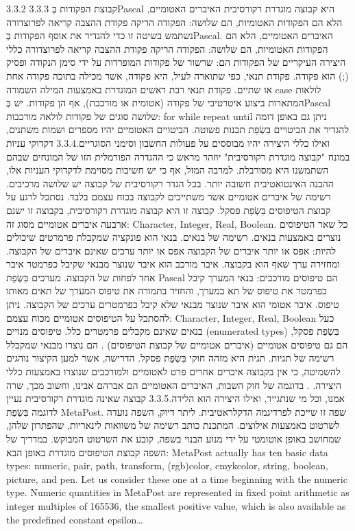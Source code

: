 3.3.2
​3.3.3​ קבוצת הפקודות בְּPascal היא קבוצה מוגדרת רקורסיבית
האיברים האטומיים, הלא הם הפקודות האטומיות, הם שלושה:
הפקודה הריקה
פקודת ההצבה
קריאה לפרוצדורה
נשתמש בשיטה זו כדי להגדיר את אוסף הפקודות בְּPascal. האיברים האטומיים, הלא הם הפקודות האטומיות, הם שלושה:
הפקודה הריקה
פקודת ההצבה
קריאה לפרוצדורה
כללי היצירה העיקריים של הפקודות הם:
שרשור של פקודות המופרדות על ידי סימן הנקודה ופסיק (;) הוא פקודה.
פקודת תנאי, כפי שתוארה לעיל, היא פקודה, אשר מכילה בתוכה פקודה אחת או שתיים.
פקודת תנאי רבת ראשים המוגדרת באמצעות המילה השמורה case
לולאות המתארות ביצוע איטרטיבי של פקודה (אטומית או מורכבת), אף הן פקודות. יש בְּPascal שלושה סוגים של פקודות לולאה מורכבות:
for
while
repeat until
ניתן גם באופן דומה להגדיר את הביטויים בִּשְׂפַת תכנות פשוטה. הביטויים האטומיים יהיו מספרים ושמות משתנים, ואילו כללי היצירה יהיו מבוססים על פעולות החשבון וסימני הסוגריים.
​3.3.4​ דקדוקי עניות במונח "קבוצה מוגדרת רקורסיבית"
יוזהר מראש כי ההגדרה הפורמלית הזו של המונחים שבהם השתמשנו היא מסורבלת. למרבה המזל, אף כי יש חשיבות מסוימת לדקדוקי העניות אלו, ההבנה האינטואטיבית חשובה יותר.
בכל הגדר רקורסיבית של קבוצה יש שלושה מרכיבים.
רשימה של איברים אטומיים אשר משתייכים לקבוצה בכוח עצמם בלבד.
נסתכל לרגע על קבוצת הטיפוסים בִּשְׂפַת פסקל. קבוצה זו היא קבוצה מוגדרת רקורסיבית, בקבוצה זו ישנם ארבעה איברים אטומיים מסוג זה: Character, Integer, Real, Boolean. כל שאר הטיפוסים נוצרים באמצעות בנאים.
רשימה של בנאים.
בנאי הוא פונקציה שמקבלת פרמרטים שיכולים להיות:
אפס או יותר איברים של הקבוצה
אפס או יותר ערכים שאינם איברים של הקבוצה.
ומחזירה ערך שאף הוא בקבוצה.
איבר מורכב הוא איבר שנוצר מבנאי שקיבל כפרמטר איבר אחד לפחות של הקבוצה.
מערכים בִּשְׂפַת Pascal הם טיפוסים מורכבים: בנאי המערך קיבל כפרמטר את טיפוס של תא במערך, והחזיר בתמורה את טיפוס המערך של תאים מאותו טיפוס.
איבר אטומי הוא איבר שנוצר מבנאי שלא קיבל כפרמטרים ערכים של הקבוצה.
ניתן להסתכל על הטיפוסים אטומיים מכוח עצמם: Character, Integer, Real, Boolean כעל בנאים שאינם מקבלים פרמטרים כלל.
טיפוסים מנויים (enumerated types) בִּשְׂפַת פסקל, הם גם טיפוסים אטומיים (איברים אטומיים של קבוצת הטיפוסים) . הם נוצרו מבנאי שמקבלל רשימה של תגיות. תגית היא מזהה חוקי בִּשְׂפַת פסקל.
הדרישה, אשר למען הקיצור נוהגים להשמיטה, כי אין בקבוצה איברים אחרים פרט לאטומיים ולמורכבים שנוצרו באמצעות כללי היצירה. .
בדוגמה של חוק השבות, האיברים האטומיים הם אברהם אבינו, וחשוב מכך, שרה אמנו, וכל מי שנתגייר, ואילו היצירה הוא הלידה.
​3.3.5​ קבוצה שאינה מוגדרת רקורסיבית
נעיין לדוגמה בִּשְׂפַת MetaPost. שפה זו שייכת לפרדיגמה הדקלראטיבית. ליתר דיוק, השפה נועדה לשרטוט באמצעות אילוצים. המתכנת כותב רשימה של משוואות לינאריות, שהפתרון שלהן, שמחושב באופן אוטומטי על ידי מנוע הבנוי בשפה, קובע את השרטוט המבוקש.
במדריך של השפה קבוצת הטיפוסים מוגדרת באופן הבא:
MetaPost actually has ten basic data types: numeric, pair, path, transform, (rgb)color, cmykcolor, string, boolean, picture, and pen. Let us consider these one at a time beginning with the numeric type.
Numeric quantities in MetaPost are represented in fixed point arithmetic as
integer multiples of 165536, the smallest positive value, which is also
available as the predefined constant epsilon…

